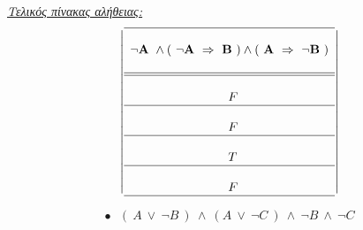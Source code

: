 \documentclass[10pt]{article}
\begin{document}
\underline{\it Τελικός πίνακας αλήθειας:}
\[ 
\left | 
\begin{array}{l}
 \hline \\
 \bf \neg A \ \wedge ( \ \neg A \ \Rightarrow \  B \ ) \wedge ( \ A \ \Rightarrow \  \neg B \ )
\\  \\ 
\hline \hline  \\
\hspace{28mm}F \\
\hline \\
\hspace{28mm}F \\
\hline \\
\hspace{28mm}T \\
\hline \\
\hspace{28mm}F \\
\hline
\end{array} 
\right | \] 



\vspace{5mm}

\[
\bullet \ \ \ ( \ A \ \vee \ \neg B \ ) \ \wedge \ ( A \ 
\vee \ \neg C \ ) \ \wedge \ \neg B \ \wedge \ \neg C \]
\end{document}
